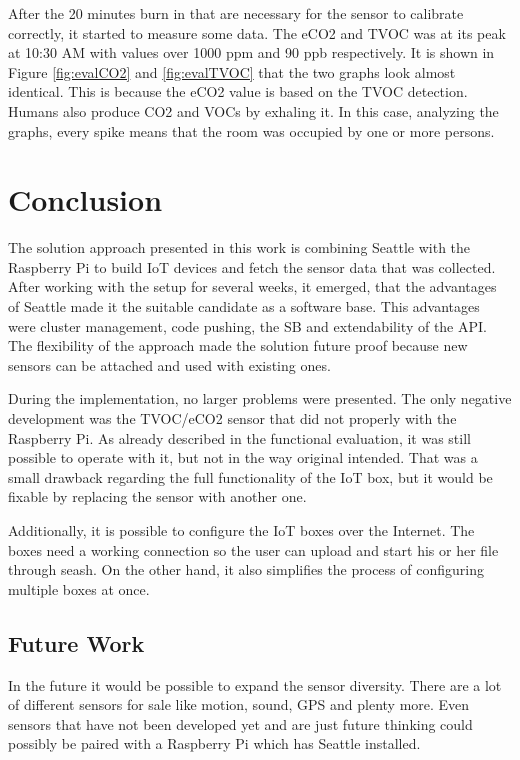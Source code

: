 \documentclass{article}      %
\begin{document}
After the 20 minutes burn in that are necessary for the sensor to calibrate correctly, it started to measure some data. The \gls{eCO2} and \gls{TVOC} was at its peak at 10:30 AM with values over 1000 \gls{ppm} and 90 \gls{ppb} respectively. It is shown in Figure \ref{fig:evalCO2} and \ref{fig:evalTVOC} that the two graphs look almost identical. This is because the \gls{eCO2} value is based on the \gls{TVOC} detection. Humans also produce \gls{CO2} and \glspl{VOC} by exhaling it. In this case, analyzing the graphs, every spike means that the room was occupied by one or more persons.


\section{Conclusion} \label{sec:conclusio}

The solution approach presented in this work is combining Seattle with the Raspberry Pi to build \gls{IoT} devices and fetch the sensor data that was collected. After working with the setup for several weeks, it emerged, that the advantages of Seattle made it the suitable candidate as a software base. This advantages were cluster management, code pushing, the \gls{SB} and extendability of the API. The flexibility of the approach made the solution future proof because new sensors can be attached and used with existing ones.

During the implementation, no larger problems were presented. The only negative development was the \gls{TVOC}/\gls{eCO2} sensor that did not properly with the Raspberry Pi. As already described in the functional evaluation, it was still possible to operate with it, but not in the way original intended. That was a small drawback regarding the full functionality of the \gls{IoT} box, but it would be fixable by replacing the sensor with another one.

Additionally, it is possible to configure the \gls{IoT} boxes over the Internet. The boxes need a working connection so the user can upload and start his or her file through \gls{seash}. On the other hand, it also simplifies the process of configuring multiple boxes at once.

\subsection{Future Work}

In the future it would be possible to expand the sensor diversity. There are a lot of different sensors for sale like motion, sound, GPS and plenty more. Even sensors that have not been developed yet and are just future thinking could possibly be paired with a Raspberry Pi which has Seattle installed. 
\end{document}
